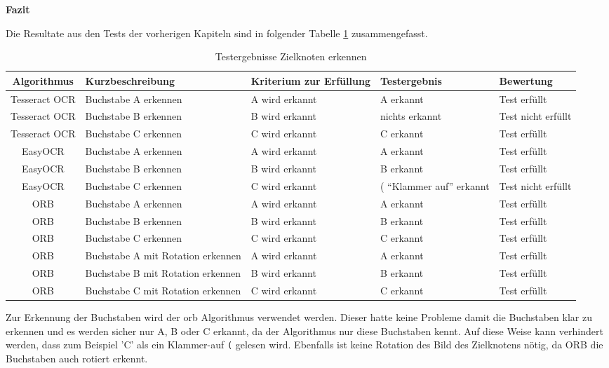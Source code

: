 \textbf{Fazit}

Die Resultate aus den Tests der vorherigen Kapiteln sind in folgender Tabelle \ref{tab:test-target-node} zusammengefasst.

\begin{table}[H]
\centering
\small
\begin{tabularx}{\textwidth}{|c|X|X|X|l|}
        \hline
        \textbf{Algorithmus} & \textbf{Kurzbeschreibung} & \textbf{Kriterium zur Erfüllung} & \textbf{Testergebnis} & \textbf{Bewertung} \\
        \hline \hline
        Tesseract OCR & Buchstabe A erkennen & A wird erkannt & A erkannt & Test erfüllt \\ \hline
        Tesseract OCR & Buchstabe B erkennen & B wird erkannt & nichts erkannt & Test nicht erfüllt \\ \hline
        Tesseract OCR & Buchstabe C erkennen & C wird erkannt &  C erkannt & Test erfüllt \\ \hline \hline
        EasyOCR & Buchstabe A erkennen & A wird erkannt & A erkannt & Test erfüllt \\ \hline
        EasyOCR & Buchstabe B erkennen & B wird erkannt & B erkannt &  Test erfüllt \\ \hline
        EasyOCR & Buchstabe C erkennen & C wird erkannt & ( ``Klammer auf'' erkannt & Test nicht erfüllt \\ \hline \hline
        ORB & Buchstabe A erkennen & A wird erkannt & A erkannt & Test erfüllt \\ \hline
        ORB & Buchstabe B erkennen & B wird erkannt & B erkannt & Test erfüllt \\ \hline
        ORB & Buchstabe C erkennen & C wird erkannt & C erkannt & Test erfüllt \\ \hline
        ORB & Buchstabe A mit Rotation erkennen & A wird erkannt & A erkannt & Test erfüllt \\ \hline
        ORB & Buchstabe B mit Rotation erkennen & B wird erkannt & B erkannt & Test erfüllt \\ \hline
        ORB & Buchstabe C mit Rotation erkennen & C wird erkannt & C erkannt & Test erfüllt \\ \hline

\end{tabularx}
    \caption{Testergebnisse Zielknoten erkennen}
\label{tab:test-target-node}
\end{table}

Zur Erkennung der Buchstaben wird der \acrshort{orb} Algorithmus verwendet werden. Dieser hatte keine Probleme damit die Buchstaben klar zu erkennen und es werden sicher nur A, B oder C erkannt, da der Algorithmus nur diese Buchstaben kennt. Auf diese Weise kann verhindert werden, dass zum Beispiel 'C' als ein Klammer-auf \verb|(| gelesen wird. Ebenfalls ist keine Rotation des Bild des Zielknotens nötig, da ORB die Buchstaben auch rotiert erkennt.


